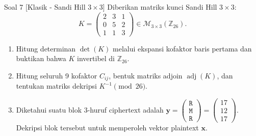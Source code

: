 \documentclass[11pt,a4paper]{article}
\begin{document}
\begin{soalklasik}{Soal 7 [Klasik - Sandi Hill $3 \times 3$]}
Diberikan matriks kunci Sandi Hill $3 \times 3$:
\[
K = \begin{pmatrix} 2 & 3 & 1 \\ 0 & 5 & 2 \\ 1 & 1 & 3 \end{pmatrix} \in \mathcal{M}_{3 \times 3}(\mathbb{Z}_{26}).
\]
\begin{enumerate}[label=(\alph*)]
    \item Hitung determinan $\det(K)$ melalui ekspansi kofaktor baris pertama dan buktikan bahwa $K$ invertibel di $\mathbb{Z}_{26}$.
    \item Hitung seluruh 9 kofaktor $C_{ij}$, bentuk matriks adjoin $\operatorname{adj}(K)$, dan tentukan matriks dekripsi $K^{-1} \pmod{26}$.
    \item Diketahui suatu blok 3-huruf ciphertext adalah $\mathbf{y} = \begin{pmatrix} \texttt{R} \\ \texttt{M} \\ \texttt{R} \end{pmatrix} = \begin{pmatrix} 17 \\ 12 \\ 17 \end{pmatrix}$. Dekripsi blok tersebut untuk memperoleh vektor plaintext $\mathbf{x}$.
\end{enumerate}
\end{soalklasik}
\end{document}
